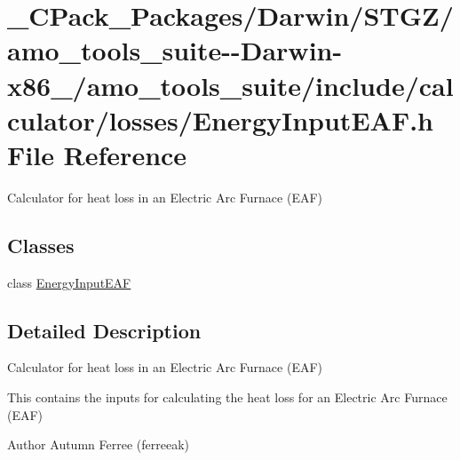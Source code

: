 \hypertarget{___c_pack___packages_2_darwin_2_s_t_g_z_2amo__tools__suite--_darwin-x86__64_2amo__tools__suite_25a35b9aa0eebdbaae0658026a04be93f}{}\section{\+\_\+\+C\+Pack\+\_\+\+Packages/\+Darwin/\+S\+T\+G\+Z/amo\+\_\+tools\+\_\+suite-\/-\/\+Darwin-\/x86\+\_/amo\+\_\+tools\+\_\+suite/include/calculator/losses/\+Energy\+Input\+E\+AF.h File Reference}
\label{___c_pack___packages_2_darwin_2_s_t_g_z_2amo__tools__suite--_darwin-x86__64_2amo__tools__suite_25a35b9aa0eebdbaae0658026a04be93f}


Calculator for heat loss in an Electric Arc Furnace (E\+AF)  


\subsection*{Classes}
\begin{DoxyCompactItemize}
\item 
class \hyperlink{class_energy_input_e_a_f}{Energy\+Input\+E\+AF}
\end{DoxyCompactItemize}


\subsection{Detailed Description}
Calculator for heat loss in an Electric Arc Furnace (E\+AF) 

This contains the inputs for calculating the heat loss for an Electric Arc Furnace (E\+AF)

\begin{DoxyAuthor}{Author}
Autumn Ferree (ferreeak) 
\end{DoxyAuthor}
